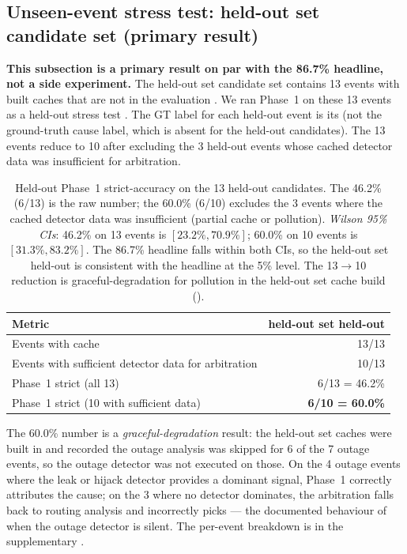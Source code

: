 \subsection{Unseen-event stress test: held-out set candidate set (primary result)}
\label{sec:heldout-stress}

\textbf{This subsection is a primary result on par with
the 86.7\% headline, not a side experiment.} The held-out set
candidate set contains 13 events with built
caches that are not in the evaluation
.
We ran Phase~1 on these 13 events as a held-out stress
test .
The GT label for each held-out event is its
 (not the ground-truth cause label,
which is absent for the held-out candidates). The 13 events
reduce to 10 after excluding the 3 held-out events whose
cached detector data was insufficient for arbitration.

\begin{table}[h]
\centering
\small
\setlength{\tabcolsep}{4pt}
\begin{tabular}{p{}r}
\hline
Metric & held-out set held-out \\
\hline
Events with cache & 13/13 \\
Events with sufficient detector data for arbitration & 10/13 \\
Phase~1 strict (all 13) & 6/13 = 46.2\% \\
Phase~1 strict (10 with sufficient data) & \textbf{6/10 = 60.0\%} \\
\hline
\end{tabular}

\caption{Held-out Phase~1 strict-accuracy on the 13 held-out
candidates. The 46.2\% (6/13) is the raw number; the
60.0\% (6/10) excludes the 3 events where the cached
detector data was insufficient (partial cache or
\protect pollution). \emph{Wilson 95\% CIs}:
46.2\% on 13 events is $[23.2\%, 70.9\%]$; 60.0\% on
10 events is $[31.3\%, 83.2\%]$. The 86.7\% headline
falls within both CIs, so the held-out set held-out is
consistent with the headline at the 5\% level.
The 13$\to$10 reduction is graceful-degradation for
\protect pollution in the held-out set cache build
().}
\label{tab:heldout-detail}
\end{table}

The 60.0\% number is a \emph{graceful-degradation}
result: the held-out set caches were built in
and recorded the outage analysis was skipped for
6 of the 7 outage events, so the outage detector was
not executed on those. On the 4 outage events where
the leak or hijack detector provides a dominant
signal, Phase~1 correctly attributes the cause; on
the 3 where no detector dominates, the arbitration
falls back to routing analysis and incorrectly picks
 --- the documented
behaviour of when the outage
detector is silent. The per-event breakdown is in
the supplementary .

